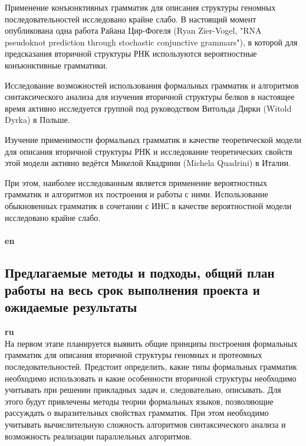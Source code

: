\documentclass[12pt]{article}  %
\theoremstyle{remark}
\begin{document}
Применение конъюнктивных грамматик для описания структуры геномных последовательностей исследовано крайне слабо.
В настоящий момент опубликована одна работа Райана Цир-Фогеля (Ryan Zier-Vogel, "RNA pseudoknot prediction through stochastic conjunctive grammars"), в которой для предсказания вторичной структуры РНК используются вероятностные конъюнктивные грамматики.

Исследование возможностей использования формальных грамматик и алгоритмов синтаксического анализа для изучения вторичной структуры белков в настоящее время активно исследуется группой под руководством Витольда Дирки (Witold Dyrka) в Польше.

Изучение применимости формальных грамматик в качестве теоретической модели для описания вторичной структуры РНК и исследование теоретических свойств этой модели активно ведётся Микелой Квадрини (Michela Quadrini) в Италии.

При этом, наиболее исследованным является применение вероятностных грамматик и алгоритмов их построения и работы с ними.
Использование обыкновенных грамматик в сочетании с ИНС в качестве вероятностной модели исследовано крайне слабо.
\\
\\
\textbf{en}\\



\subsection{Предлагаемые методы и подходы, общий план работы на весь срок выполнения проекта и ожидаемые результаты }

\textbf{ru}\\
На первом этапе планируется выявить общие принципы построения формальных грамматик для описания вторичной структуры геномных и протеомных последовательностей.
Предстоит определить, какие типы формальных грамматик необходимо использовать и какие особенности вторичной структуры необходимо учитывать при решении прикладных задач и, следовательно, описывать.
Для этого будут привлечены методы теории формальных языков, позволяющие рассуждать о выразительных свойствах грамматик.
При этом необходимо учитывать вычислительную сложность алгоритмов синтаксического анализа и возможность реализации параллельных алгоритмов.
\end{document}

